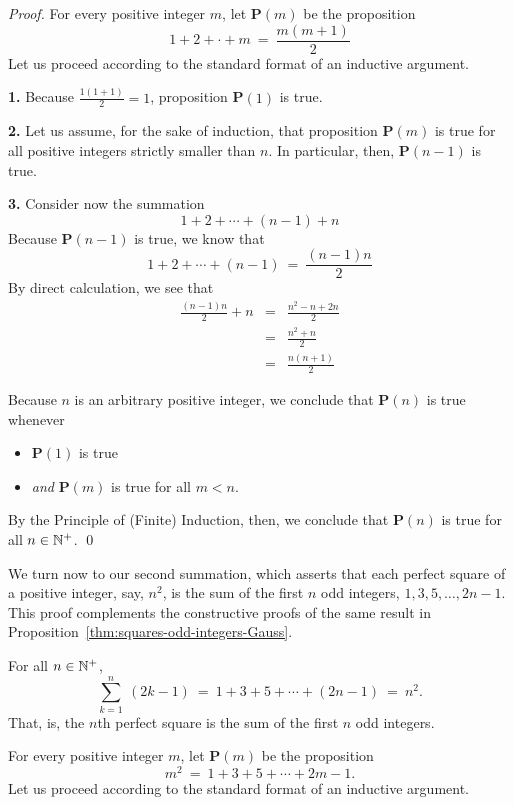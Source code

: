 \begin{proof}
For every positive integer $m$, let {\bf P}$(m)$ be the proposition
\[  1 + 2 + \cdot + m \ = \ \frac{m(m+1)}{2} \]
Let us proceed according to the standard format of an inductive
argument.

{\bf 1.} Because $\frac{1(1+1)}{2}  = 1$, proposition {\bf
  P}$(1)$ is true.

{\bf 2.} Let us assume, for the sake of induction, that proposition
{\bf P}$(m)$ is true for all positive integers strictly smaller than
$n$.  In particular, then, {\bf P}$(n-1)$ is true.

{\bf 3.} Consider now the summation
\[ 1 + 2 + \cdots + (n-1) + n \]
Because {\bf P}$(n-1)$ is true, we know that
\[ 1 + 2 + \cdots + (n-1) \ = \ \frac{(n-1)n}{2} \]
By direct calculation, we see that
\begin{eqnarray*}
\frac{(n-1)n}{2} + n
  & = & \frac{n^2 - n + 2n}{2} \\
  & = & \frac{n^2 + n}{2} \\
  & = & \frac{n(n+1)}{2}
\end{eqnarray*}

Because $n$ is an arbitrary positive integer, we conclude that
{\bf P}$(n)$ is true whenever
\begin{itemize}
\item
{\bf P}$(1)$ is true
\item
{\em and}
{\bf P}$(m)$ is true for all $m < n$.
\end{itemize}
By the Principle of (Finite) Induction, then, we conclude that {\bf
  P}$(n)$ is true for all $n \in \mathbb{N}^+$.
\qed
\end{proof}

\bigskip

We turn now to our second summation, which asserts that each perfect
square of a positive integer, say, $n^2$, is the sum of the first $n$
odd integers, $1, 3, 5, \ldots, 2n-1$.  This proof complements the
constructive proofs of the same result in
Proposition~\ref{thm:squares-odd-integers-Gauss}.

\begin{prop}
\label{thm:squares-odd-integers-induction1}
For all $n \in \mathbb{N}^+$,
\[
\sum_{k=1}^n \ (2k-1)
 \ = \ 1 + 3 + 5 + \cdots + (2n-1) \ = \ n^2.
\]
That, is, the $n$th perfect square is the sum of the first $n$ odd
integers.
\end{prop}

%
For every positive integer $m$, let {\bf P}$(m)$ be the proposition
\[ m^2 \ = \ 1 + 3 + 5 + \cdots + 2m-1. \]
Let us proceed according to the standard format of an inductive
argument.

